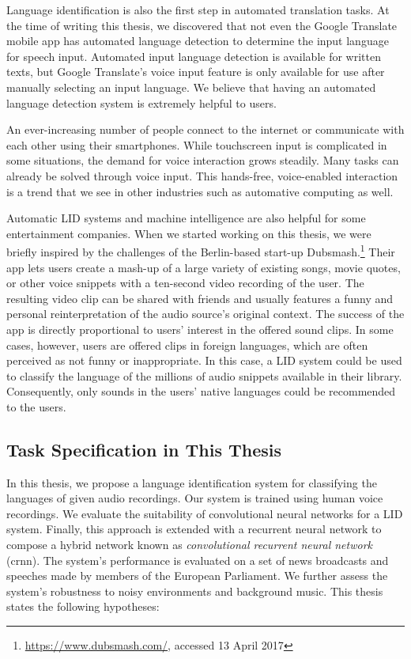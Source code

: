 Language identification is also the first step in automated translation tasks. At the time of writing this thesis, we discovered that not even the Google Translate mobile app has automated language detection to determine the input language for speech input. Automated input language detection is available for written texts, but Google Translate's voice input feature is only available for use after manually selecting an input language. We believe that having an automated language detection system is extremely helpful to users.

An ever-increasing number of people connect to the internet or communicate with each other using their smartphones. While touchscreen input is complicated in some situations, the demand for voice interaction grows steadily. Many tasks can already be solved through voice input. This hands-free, voice-enabled interaction is a trend that we see in other industries such as automative computing as well.

Automatic LID systems and machine intelligence are also helpful for some entertainment companies. When we started working on this thesis, we were briefly inspired by the challenges of the Berlin-based start-up Dubsmash.\footnote{\url{https://www.dubsmash.com/}, accessed 13 April 2017} Their app lets users create a mash-up of a large variety of existing songs, movie quotes, or other voice snippets with a ten-second video recording of the user. The resulting video clip can be shared with friends and usually features a funny and personal reinterpretation of the audio source's original context. The success of the app is directly proportional to users' interest in the offered sound clips. In some cases, however, users are offered clips in foreign languages, which are often perceived as not funny or inappropriate. In this case, a LID system could be used to classify the language of the millions of audio snippets available in their library. Consequently, only sounds in the users' native languages could be recommended to the users.


\subsection{Task Specification in This Thesis}
\label{sec:task-specification}
In this thesis, we propose a language identification system for classifying the languages of given audio recordings. Our system is trained using human voice recordings. We evaluate the suitability of convolutional neural networks for a LID system. Finally, this approach is extended with a recurrent neural network to compose a hybrid network known as \emph{convolutional recurrent neural network} (\ac{crnn}). The system's performance is evaluated on a set of news broadcasts and speeches made by members of the European Parliament. We further assess the system's robustness to noisy environments and background music. This thesis states the following hypotheses:

